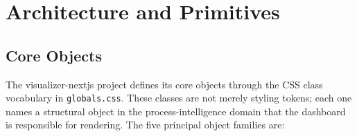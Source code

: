 
\section{Architecture and Primitives}
\label{sec:experiments-visualizer-nextjs-arch}

\subsection{Core Objects}
\label{sec:experiments-visualizer-nextjs-arch-objects}

The visualizer-nextjs project defines its core objects through the CSS class vocabulary in
\texttt{globals.css}. These classes are not merely styling tokens; each one names a
structural object in the process-intelligence domain that the dashboard is responsible for
rendering. The five principal object families are:

